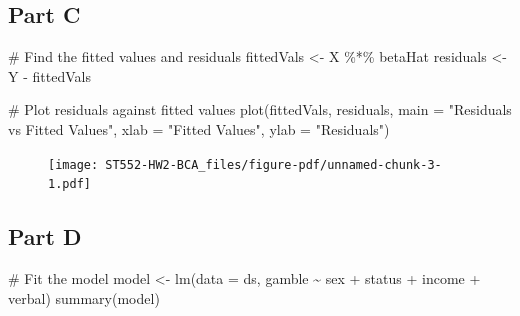 \documentclass[
  letterpaper,
  DIV=11,
  numbers=noendperiod]{scrartcl}
\newenvironment{Shaded}{}{}
\newcommand{\AttributeTok}[1]{\textcolor[rgb]{0.84,0.60,0.13}{#1}}
\newcommand{\CommentTok}[1]{\textcolor[rgb]{0.57,0.51,0.45}{#1}}
\newcommand{\FunctionTok}[1]{\textcolor[rgb]{0.41,0.62,0.42}{#1}}
\newcommand{\NormalTok}[1]{\textcolor[rgb]{0.24,0.22,0.21}{#1}}
\newcommand{\OtherTok}[1]{\textcolor[rgb]{0.41,0.62,0.42}{#1}}
\newcommand{\SpecialCharTok}[1]{\textcolor[rgb]{0.69,0.38,0.53}{#1}}
\newcommand{\StringTok}[1]{\textcolor[rgb]{0.60,0.59,0.10}{#1}}
\begin{document}
\newpage{}

\hypertarget{part-c-1}{%
\subsection{Part C}\label{part-c-1}}

\begin{Shaded}
\begin{Highlighting}[]
\CommentTok{\# Find the fitted values and residuals}
\NormalTok{fittedVals }\OtherTok{\textless{}{-}}\NormalTok{ X }\SpecialCharTok{\%*\%}\NormalTok{ betaHat}
\NormalTok{residuals }\OtherTok{\textless{}{-}}\NormalTok{ Y }\SpecialCharTok{{-}}\NormalTok{ fittedVals}

\CommentTok{\# Plot residuals against fitted values}
\FunctionTok{plot}\NormalTok{(fittedVals, residuals, }\AttributeTok{main =} \StringTok{"Residuals vs Fitted Values"}\NormalTok{, }
     \AttributeTok{xlab =} \StringTok{"Fitted Values"}\NormalTok{, }\AttributeTok{ylab =} \StringTok{"Residuals"}\NormalTok{)}
\end{Highlighting}
\end{Shaded}

\begin{figure}[H]

{\centering \texttt{[image: ST552-HW2-BCA\_files/figure-pdf/unnamed-chunk-3-1.pdf]}

}

\end{figure}

\newpage{}

\hypertarget{part-d-1}{%
\subsection{Part D}\label{part-d-1}}

\begin{Shaded}
\begin{Highlighting}[]
\CommentTok{\# Fit the model}
\NormalTok{model }\OtherTok{\textless{}{-}} \FunctionTok{lm}\NormalTok{(}\AttributeTok{data =}\NormalTok{ ds, gamble }\SpecialCharTok{\textasciitilde{}}\NormalTok{ sex }\SpecialCharTok{+}\NormalTok{ status }\SpecialCharTok{+}\NormalTok{ income }\SpecialCharTok{+}\NormalTok{ verbal)}
\FunctionTok{summary}\NormalTok{(model)}
\end{Highlighting}
\end{Shaded}
\end{document}
